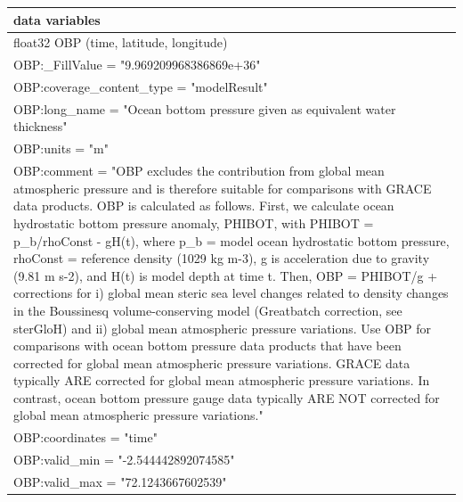 \begin{longtable}{|p{\textwidth}|}
data variables\\
\hline
\hspace{0.5cm}float32 OBP (time, latitude, longitude)\\
\hspace{0.5cm}\hspace{0.5cm}OBP:\_FillValue = "9.969209968386869e+36"\\
\hspace{0.5cm}\hspace{0.5cm}OBP:coverage\_content\_type = "modelResult"\\
\hspace{0.5cm}\hspace{0.5cm}OBP:long\_name = "Ocean bottom pressure given as equivalent water thickness"\\
\hspace{0.5cm}\hspace{0.5cm}OBP:units = "m"\\
\hspace{0.5cm}\hspace{0.5cm}OBP:comment = "OBP excludes the contribution from global mean atmospheric pressure and is therefore suitable for comparisons with GRACE data products. OBP is calculated as follows. First, we calculate ocean hydrostatic bottom pressure anomaly, PHIBOT, with PHIBOT = p\_b/rhoConst - gH(t), where p\_b = model ocean hydrostatic bottom pressure, rhoConst = reference density (1029 kg m-3), g is acceleration due to gravity (9.81 m s-2), and H(t) is model depth at time t. Then, OBP = PHIBOT/g + corrections for i) global mean steric sea level changes related to density changes in the Boussinesq volume-conserving model (Greatbatch correction, see sterGloH) and ii) global mean atmospheric pressure variations. Use OBP for comparisons with ocean bottom pressure data products that have been corrected for global mean atmospheric pressure variations. GRACE data typically ARE corrected for global mean atmospheric pressure variations. In contrast, ocean bottom pressure gauge data typically ARE NOT corrected for global mean atmospheric pressure variations."\\
\hspace{0.5cm}\hspace{0.5cm}OBP:coordinates = "time"\\
\hspace{0.5cm}\hspace{0.5cm}OBP:valid\_min = "-2.544442892074585"\\
\hspace{0.5cm}\hspace{0.5cm}OBP:valid\_max = "72.1243667602539"\\

\end{longtable}
